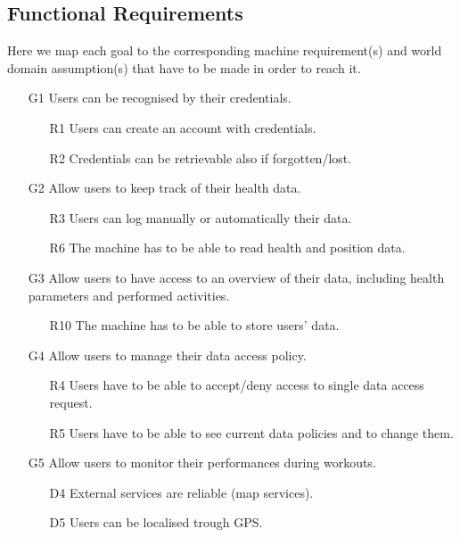 \documentclass{article}
\begin{document}
\newpage
\subsection{Functional Requirements}	

Here we map each goal to the corresponding machine requirement(s) and 
world domain assumption(s) that have to be made in order to reach it.

\begin{itemize}	

	\item [G1] Users can be recognised by their credentials.
	\begin{itemize}
		\item [R1] Users can create an account with credentials.
		\item [R2] Credentials can be retrievable also if 
		forgotten/lost.
	\end{itemize} 

	\item [G2] Allow users to keep track of their health data.	
	\begin{itemize}
		\item [R3] Users can log manually or automatically their data.
		\item [R6] The machine has to be able to read health and 
		position data.
	\end{itemize}
	
	\item [G3] Allow users to have access to an overview of their 
	data, including health parameters and performed activities.
	\begin{itemize}
		\item [R10] The machine has to be able to store users’ data.
	\end{itemize}
	
	\item [G4] Allow users to manage their data access policy.
	\begin{itemize}
		\item [R4] Users have to be able to accept/deny access to 
		single data access request.
		\item [R5] Users have to be able to see current data policies
		and to change them.
	\end{itemize}
	
	\item [G5] Allow users to monitor their performances during 
	workouts.	
	\begin{itemize}
		\item [D4] External services are reliable (map services).
		\item [D5] Users can be localised trough GPS.
	\end{itemize}	
	

\end{itemize}
\end{document}
